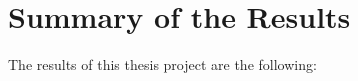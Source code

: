 \documentclass{report}
\begin{document}
% 
%
%

\chapter{Summary of the Results}
The results of this thesis project are the following:
\end{document}
